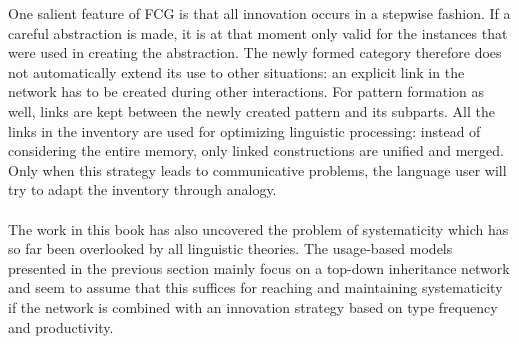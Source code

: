 One salient feature of FCG is that all innovation occurs in a stepwise fashion. If a careful abstraction is made, it is at that moment only valid for the instances that were used in creating the abstraction. The newly formed category therefore does not automatically extend its use to other situations: an explicit link in the network has to be created during other interactions. For pattern formation as well, links are kept between the newly created pattern and its subparts. All the links in the inventory are used for optimizing linguistic processing: instead of considering the entire memory, only linked constructions are unified and merged. Only when this strategy leads to communicative problems, the language user will try to adapt the inventory through analogy.
\\
\\
 The work in this book has also uncovered the problem of systematicity which has so far been overlooked by all linguistic theories. The usage-based models presented in the previous section mainly focus on a top-down inheritance network and seem to assume that this suffices for reaching and maintaining systematicity if the network is combined with an innovation strategy based on type frequency and productivity.

